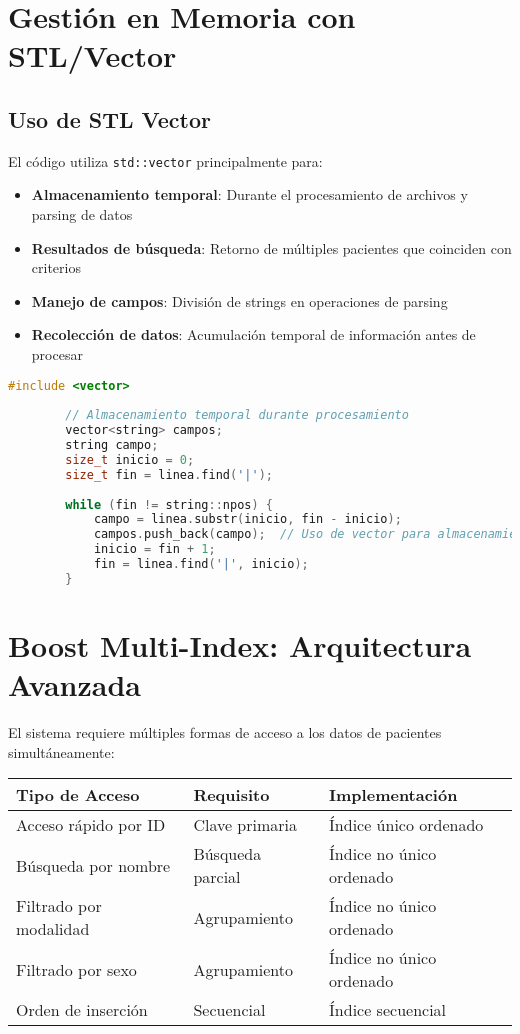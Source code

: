 \documentclass[12pt]{article}
\begin{document}
	\section{Gestión en Memoria con STL/Vector}
	
	\subsection*{Uso de STL Vector}
	
	El código utiliza \texttt{std::vector} principalmente para:
		
	\begin{itemize}
		\item \textbf{Almacenamiento temporal}: Durante el procesamiento de archivos y parsing de datos
		\item \textbf{Resultados de búsqueda}: Retorno de múltiples pacientes que coinciden con criterios
		\item \textbf{Manejo de campos}: División de strings en operaciones de parsing
		\item \textbf{Recolección de datos}: Acumulación temporal de información antes de procesar
	\end{itemize}
	
	\begin{lstlisting}[language=C++,caption=Uso de vector en el parsing de datos]
		#include <vector>
		
		// Almacenamiento temporal durante procesamiento
		vector<string> campos;
		string campo;
		size_t inicio = 0;
		size_t fin = linea.find('|');
		
		while (fin != string::npos) {
			campo = linea.substr(inicio, fin - inicio);
			campos.push_back(campo);  // Uso de vector para almacenamiento temporal
			inicio = fin + 1;
			fin = linea.find('|', inicio);
		}
	\end{lstlisting}
	
	\section{Boost Multi-Index: Arquitectura Avanzada}
	
	El sistema requiere múltiples formas de acceso a los datos de pacientes simultáneamente:
	
	\begin{table}[h]
		\centering
		\begin{tabular}{|l|l|l|}
			\hline
			\textbf{Tipo de Acceso} & \textbf{Requisito} & \textbf{Implementación} \\
			\hline
			Acceso rápido por ID & Clave primaria & Índice único ordenado \\
			Búsqueda por nombre & Búsqueda parcial & Índice no único ordenado \\
			Filtrado por modalidad & Agrupamiento & Índice no único ordenado \\
			Filtrado por sexo & Agrupamiento & Índice no único ordenado \\
			Orden de inserción & Secuencial & Índice secuencial \\
			\hline
		\end{tabular}
	\end{table}
\end{document}
